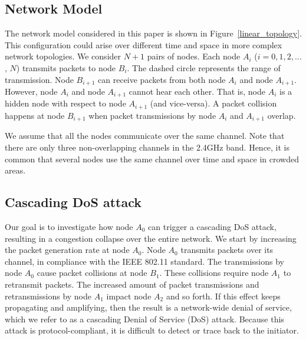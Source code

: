 \documentclass{IEEEtran}
\begin{document}
\subsection{Network Model}
\label{Network Model}
The network model considered in this paper is shown in Figure~\ref{linear_topology}. This configuration could arise over different time and space
in
more complex network topologies. We consider
 $N+1$ pairs of nodes.  Each node $A_i$ ($i=0, 1, 2, \ldots$, $N$)
transmits packets to node $B_i$. The dashed circle represents the
range of transmission. Node $B_{i+1}$ can receive packets from both node
$A_i$ and node $A_{i+1}$. However, node $A_i$ and node $A_{i+1}$
cannot hear each other. That is, node $A_i$ is a hidden node with
respect to node $A_{i+1}$ (and vice-versa). A packet collision happens at node
$B_{i+1}$ when packet transmissions by node $A_i$ and $A_{i+1}$ overlap.

We assume that all the nodes communicate over the same channel. Note that there are only three non-overlapping channels in the 2.4GHz band.
Hence, it is common that several nodes use the same channel over time and space in crowded areas. 






\subsection{Cascading DoS attack}
Our goal is to investigate how node $A_0$ can trigger a cascading DoS
attack, resulting in a congestion collapse over the entire network. We start
by increasing the packet generation rate at node
$A_0$. Node $A_0$ transmits packets over its channel, in compliance with the IEEE 802.11 standard. The transmissions by
node $A_0$ cause packet collisions at
node $B_1$. These collisions require node $A_1$ to retransmit packets. The increased  amount of packet transmissions and retransmissions by node
$A_1$ impact node $A_2$ and so forth. If this effect keeps propagating and amplifying, then the result is a network-wide  denial of service, which
we refer to as a cascading Denial of Service (DoS) attack. Because this attack is protocol-compliant, it is difficult to detect or trace back to the
initiator.
\end{document}
